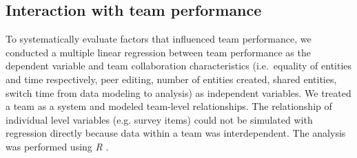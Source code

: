 \subsection{Interaction with team performance}

To systematically evaluate factors that influenced team performance, 
we conducted a multiple linear regression between team performance 
as the dependent variable and team collaboration characteristics 
(i.e.~equality of entities and time respectively, peer editing, number of entities created, shared 
entities, switch time from data modeling to analysis) as independent 
variables. We treated a team as a system \cite{Henman2003b} and modeled team-level 
relationships. 
The relationship of individual level variables (e.g. 
survey items) could not be simulated with regression directly because data within a team was interdependent. The analysis was performed using \emph{R} \cite{R2016}.

